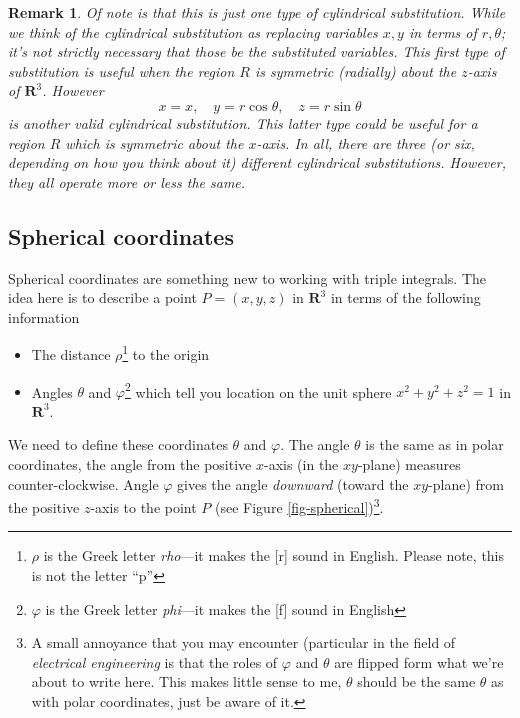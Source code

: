 \documentclass[12pt]{article}
\numberwithin{equation}{subsection}
\numberwithin{figure}{subsection}
\theoremstyle{note}
\newtheorem{remark}[subsection]{Remark}
\begin{document}
{\begin{remark}
	Of note is that this is just \textit{one} type of cylindrical substitution. While we think of the cylindrical substitution as replacing variables $x,y$ in terms of $r,\theta$; it's not strictly necessary that those be the substituted variables. This first type of substitution is useful when the region $R$ is symmetric (radially) about the $z$-axis of $\mathbf{R}^3$. However \[x=x,\quad y=r\cos\theta,\quad  z=r\sin\theta\] is another valid cylindrical substitution. This latter type could be useful for a region $R$ which is symmetric about the $x$-axis. In all, there are three (or six, depending on how you think about it) different cylindrical substitutions. However, they all operate more or less the same.
\end{remark}


\subsection{Spherical coordinates}
Spherical coordinates are something new to working with triple integrals. The idea here is to describe a point $P=(x,y,z)$ in $\mathbf{R}^3$ in terms of the following information 
\begin{itemize}
	\item The distance $\rho$\footnote{$\rho$ is the Greek letter \textit{rho}---it makes the [r] sound in English. Please note, this is not the letter ``p''} to the origin 
	\item Angles $\theta$ and $\varphi$\footnote{$\varphi$ is the Greek letter \textit{phi}---it makes the [f] sound in English} which tell you location on the unit sphere $x^2+y^2+z^2=1$ in $\mathbf{R}^3$.
	
	
\end{itemize}

We need to define these coordinates $\theta$ and $\varphi$. The angle $\theta$ is the same as in polar coordinates, the angle from the positive $x$-axis (in the $xy$-plane) measures counter-clockwise. Angle $\varphi$ gives the angle \textit{downward} (toward the $xy$-plane) from the positive $z$-axis to the point $P$ (see Figure \ref{fig-spherical})\footnote{A small annoyance that you may encounter (particular in the field of \textit{electrical engineering} is that the roles of $\varphi$ and $\theta$ are flipped form what we're about to write here. This makes little sense to me, $\theta$ should be the same $\theta$ as with polar coordinates, just be aware of it.}. 

}
\end{document}
